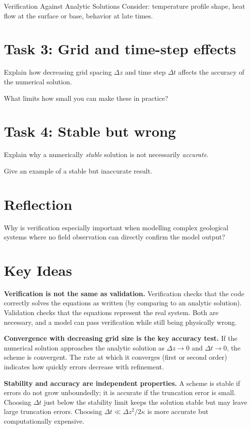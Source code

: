 \begin{activity}{Verification Against Analytic Solutions}
Consider: temperature profile shape, heat flow at the surface or base, behavior at late times.
\answerbox[4cm]

\section*{Task 3: Grid and time-step effects}

Explain how decreasing grid spacing $\Delta z$ and time step $\Delta t$ affects the accuracy of the numerical solution.

What limits how small you can make these in practice?
\answerbox[4cm]

\section*{Task 4: Stable but wrong}

Explain why a numerically \emph{stable} solution is not necessarily \emph{accurate}.

Give an example of a stable but inaccurate result.
\answerbox[3cm]

\section*{Reflection}

Why is verification especially important when modelling complex geological
systems where no field observation can directly confirm the model output?
\answerbox[4cm]

{\color{red}
\section*{Key Ideas}

\textbf{Verification is not the same as validation.} Verification checks that the code correctly solves the equations as written (by comparing to an analytic solution). Validation checks that the equations represent the real system. Both are necessary, and a model can pass verification while still being physically wrong.

\textbf{Convergence with decreasing grid size is the key accuracy test.} If the numerical solution approaches the analytic solution as $\Delta z \to 0$ and $\Delta t \to 0$, the scheme is convergent. The rate at which it converges (first or second order) indicates how quickly errors decrease with refinement.

{\color{blue}
\textbf{Stability and accuracy are independent properties.} A scheme is stable if errors do not grow unboundedly; it is accurate if the truncation error is small. Choosing $\Delta t$ just below the stability limit keeps the solution stable but may leave large truncation errors. Choosing $\Delta t \ll \Delta z^2/2\kappa$ is more accurate but computationally expensive.

}}
\end{activity}
